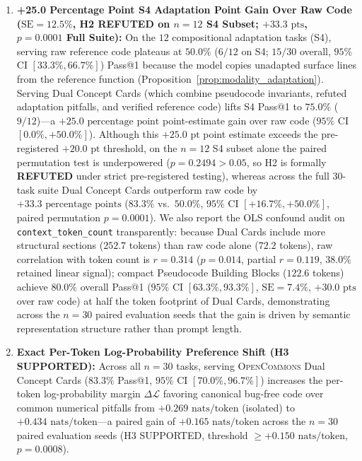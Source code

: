 \documentclass[10pt,twocolumn]{article}
\begin{document}
\begin{enumerate}
    \item \textbf{+25.0 Percentage Point S4 Adaptation Point Gain Over Raw Code ($\text{SE} = 12.5\%$, H2 REFUTED on $n=12$ S4 Subset; $+33.3\text{ pts}$, $p = 0.0001$ Full Suite):} On the $12$ compositional adaptation tasks (S4), serving raw reference code plateaus at $50.0\%$ ($6/12$ on S4; $15/30$ overall, $95\%$ CI $[33.3\%, 66.7\%]$) Pass@1 because the model copies unadapted surface lines from the reference function (Proposition~\ref{prop:modality_adaptation}). Serving Dual Concept Cards (which combine pseudocode invariants, refuted adaptation pitfalls, and verified reference code) lifts S4 Pass@1 to $75.0\%$ ($9/12$)—a $+25.0\text{ percentage point}$ point-estimate gain over raw code ($95\%$ CI $[0.0\%, +50.0\%]$). Although this $+25.0\text{ pt}$ point estimate exceeds the pre-registered $+20.0\text{ pt}$ threshold, on the $n=12$ S4 subset alone the paired permutation test is underpowered ($p = 0.2494 > 0.05$, so H2 is formally \textbf{REFUTED} under strict pre-registered testing), whereas across the full 30-task suite Dual Concept Cards outperform raw code by $+33.3\text{ percentage points}$ ($83.3\%$ vs.\ $50.0\%$, $95\%$ CI $[+16.7\%, +50.0\%]$, paired permutation $p = 0.0001$). We also report the OLS confound audit on \texttt{context\_token\_count} transparently: because Dual Cards include more structural sections ($252.7$ tokens) than raw code alone ($72.2$ tokens), raw correlation with token count is $r = 0.314$ ($p = 0.014$, partial $r = 0.119$, $38.0\%$ retained linear signal); compact Pseudocode Building Blocks ($122.6$ tokens) achieve $80.0\%$ overall Pass@1 ($95\%$ CI $[63.3\%, 93.3\%]$, $\text{SE} = 7.4\%$, $+30.0\text{ pts}$ over raw code) at half the token footprint of Dual Cards, demonstrating across the $n=30$ paired evaluation seeds that the gain is driven by semantic representation structure rather than prompt length.
    \item \textbf{Exact Per-Token Log-Probability Preference Shift (H3 SUPPORTED):} Across all $n=30$ tasks, serving \textsc{OpenCommons} Dual Concept Cards ($83.3\%$ Pass@1, $95\%$ CI $[70.0\%, 96.7\%]$) increases the per-token log-probability margin $\Delta \mathcal{L}$ favoring canonical bug-free code over common numerical pitfalls from $+0.269\text{ nats/token}$ (isolated) to $+0.434\text{ nats/token}$—a paired gain of $+0.165\text{ nats/token}$ across the $n=30$ paired evaluation seeds (H3 SUPPORTED, threshold $\ge +0.150\text{ nats/token}$, $p = 0.0008$).
\end{enumerate}
\end{document}
